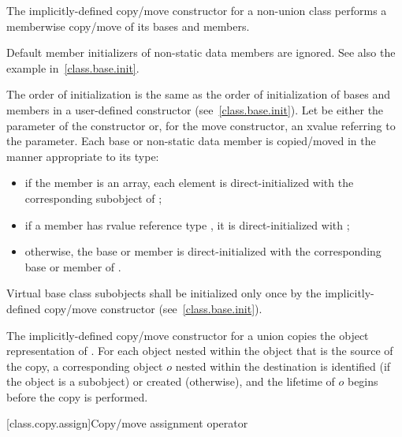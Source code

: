 \pnum
The implicitly-defined copy/move constructor for a non-union class
performs a memberwise copy/move of its bases and members.
\begin{note}
Default member initializers of non-static data members are ignored. See also the example in~\ref{class.base.init}.
\end{note}
The order of initialization is the same as the order of initialization of bases
and members in a user-defined constructor (see~\ref{class.base.init}).
Let  be either the parameter of the constructor or, for the move constructor, an
xvalue referring to the parameter.
Each base or non-static data member
is copied/moved in the manner appropriate to its type:
\begin{itemize}
\item
if the member is an array, each element is
direct-initialized with the corresponding subobject of ;

\item
if a member  has rvalue reference type , it is direct-initialized with
;

\item
otherwise, the base or member is direct-initialized with the corresponding base or member of .
\end{itemize}

%
Virtual base class subobjects shall be initialized only once by
the implicitly-defined copy/move constructor (see~\ref{class.base.init}).

\pnum
The implicitly-defined copy/move constructor for a union
 copies the object representation of .
For each object nested within
the object that is the source of the copy,
a corresponding object $o$ nested within the destination
is identified (if the object is a subobject) or created (otherwise),
and the lifetime of $o$ begins before the copy is performed.

[class.copy.assign]{Copy/move assignment operator}%

